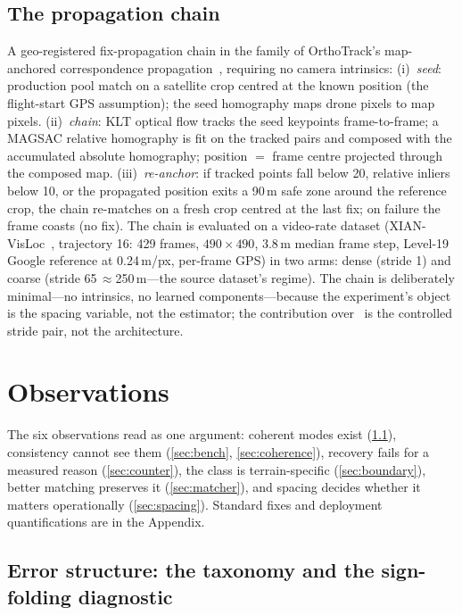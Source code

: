 \documentclass[journal]{IEEEtran}
\begin{document}
\subsection{The propagation chain}
\label{sec:chain}
A geo-registered fix-propagation chain in the family of OrthoTrack's map-anchored correspondence propagation~\cite{orthotrack}, requiring no camera intrinsics: (i)~\emph{seed}: production pool match on a satellite crop centred at the known position (the flight-start GPS assumption); the seed homography maps drone pixels to map pixels. (ii)~\emph{chain}: KLT optical flow tracks the seed keypoints frame-to-frame; a MAGSAC relative homography is fit on the tracked pairs and composed with the accumulated absolute homography; position $=$ frame centre projected through the composed map. (iii)~\emph{re-anchor}: if tracked points fall below 20, relative inliers below 10, or the propagated position exits a 90\,m safe zone around the reference crop, the chain re-matches on a fresh crop centred at the last fix; on failure the frame coasts (no fix). The chain is evaluated on a video-rate dataset (XIAN-VisLoc~\cite{xianvisloc}, trajectory 16: 429 frames, $490\times490$, 3.8\,m median frame step, Level-19 Google reference at 0.24\,m/px, per-frame GPS) in two arms: dense (stride 1) and coarse (stride 65\,$\approx$250\,m---the source dataset's regime). The chain is deliberately minimal---no intrinsics, no learned components---because the experiment's object is the spacing variable, not the estimator; the contribution over~\cite{orthotrack} is the controlled stride pair, not the architecture.

\section{Observations}
\label{sec:exp}

The six observations read as one argument: coherent modes exist (\ref{sec:structure}), consistency cannot see them (\ref{sec:bench}, \ref{sec:coherence}), recovery fails for a measured reason (\ref{sec:counter}), the class is terrain-specific (\ref{sec:boundary}), better matching preserves it (\ref{sec:matcher}), and spacing decides whether it matters operationally (\ref{sec:spacing}). Standard fixes and deployment quantifications are in the Appendix.

\subsection{Error structure: the taxonomy and the sign-folding diagnostic}
\label{sec:structure}
\end{document}
